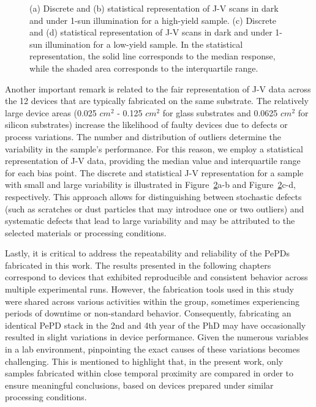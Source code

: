\begin{figure}[ht!]
\begin{subfigure}[t]{0.4\textwidth}
        \caption{}
        \label{fig:ch2:low_yield_median}
    \end{subfigure}
    \caption{(a) Discrete and (b) statistical representation of J-V scans in dark and under 1-sun illumination for a high-yield sample. (c) Discrete and (d) statistical representation of J-V scans in dark and under 1-sun illumination for a low-yield sample. In the statistical representation, the solid line corresponds to the median response, while the shaded area corresponds to the interquartile range.}
    \label{fig:ch2:discrete_and_median}
\end{figure}


Another important remark is related to the fair representation of J-V data across the 12 devices that are typically fabricated on the same substrate. The relatively large device areas (0.025 $cm^2$ - 0.125 $cm^2$ for glass substrates and 0.0625 $cm^2$ for silicon substrates) increase the likelihood of faulty devices due to defects or process variations. The number and distribution of outliers determine the variability in the sample's performance. For this reason,
we employ a statistical representation of J-V data, providing the median value and interquartile range for each bias point. The discrete and statistical J-V representation for a sample with small and large variability is illustrated in Figure~\ref{fig:ch2:discrete_and_median}a-b and Figure~\ref{fig:ch2:discrete_and_median}c-d, respectively. This approach allows for distinguishing between stochastic defects (such as scratches or dust particles that may introduce one or two outliers) and systematic defects that lead to large variability and may be attributed to the selected materials or processing conditions. 


Lastly, it is critical to address the repeatability and reliability of the PePDs fabricated in this work. The results presented in the following chapters correspond to devices that exhibited reproducible and consistent behavior across multiple experimental runs. However, the fabrication tools used in this study were shared across various activities within the group, sometimes experiencing periods of downtime or non-standard behavior. Consequently, fabricating an identical PePD stack in the 2nd and 4th year of the PhD may have occasionally resulted in slight variations in device performance. Given the numerous variables in a lab environment, pinpointing the exact causes of these variations becomes challenging. This is mentioned to highlight that, in the present work, only samples fabricated within close temporal proximity are compared in order to ensure meaningful conclusions, based on devices prepared under similar processing conditions.

 


\cleardoublepage

